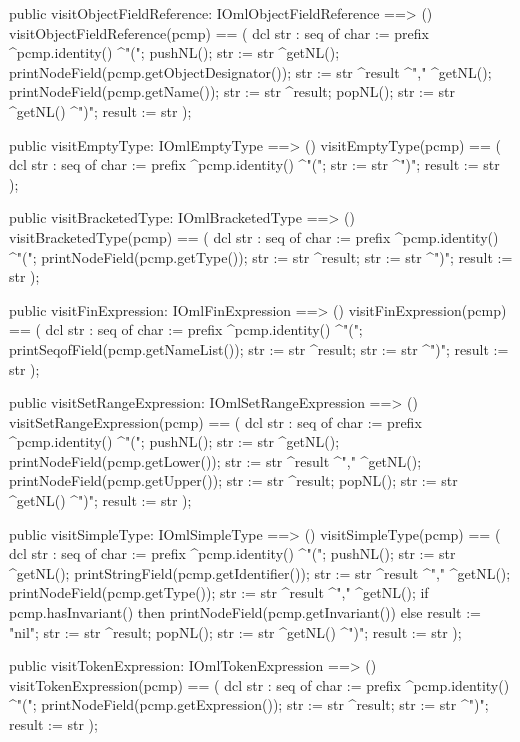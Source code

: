 \begin{vdm_al}
  public visitObjectFieldReference: IOmlObjectFieldReference ==> ()
  visitObjectFieldReference(pcmp) ==
    ( dcl str : seq of char := prefix ^pcmp.identity() ^"(";
      pushNL();
      str := str ^getNL();
      printNodeField(pcmp.getObjectDesignator());
      str := str ^result ^"," ^getNL();
      printNodeField(pcmp.getName());
      str := str ^result;
      popNL();
      str := str ^getNL() ^")";
      result := str );

  public visitEmptyType: IOmlEmptyType ==> ()
  visitEmptyType(pcmp) ==
    ( dcl str : seq of char := prefix ^pcmp.identity() ^"(";
      str := str ^")";
      result := str );

  public visitBracketedType: IOmlBracketedType ==> ()
  visitBracketedType(pcmp) ==
    ( dcl str : seq of char := prefix ^pcmp.identity() ^"(";
      printNodeField(pcmp.getType());
      str := str ^result;
      str := str ^")";
      result := str );

  public visitFinExpression: IOmlFinExpression ==> ()
  visitFinExpression(pcmp) ==
    ( dcl str : seq of char := prefix ^pcmp.identity() ^"(";
      printSeqofField(pcmp.getNameList());
      str := str ^result;
      str := str ^")";
      result := str );

  public visitSetRangeExpression: IOmlSetRangeExpression ==> ()
  visitSetRangeExpression(pcmp) ==
    ( dcl str : seq of char := prefix ^pcmp.identity() ^"(";
      pushNL();
      str := str ^getNL();
      printNodeField(pcmp.getLower());
      str := str ^result ^"," ^getNL();
      printNodeField(pcmp.getUpper());
      str := str ^result;
      popNL();
      str := str ^getNL() ^")";
      result := str );

  public visitSimpleType: IOmlSimpleType ==> ()
  visitSimpleType(pcmp) ==
    ( dcl str : seq of char := prefix ^pcmp.identity() ^"(";
      pushNL();
      str := str ^getNL();
      printStringField(pcmp.getIdentifier());
      str := str ^result ^"," ^getNL();
      printNodeField(pcmp.getType());
      str := str ^result ^"," ^getNL();
      if pcmp.hasInvariant()
      then printNodeField(pcmp.getInvariant())
      else result := "nil";
      str := str ^result;
      popNL();
      str := str ^getNL() ^")";
      result := str );

  public visitTokenExpression: IOmlTokenExpression ==> ()
  visitTokenExpression(pcmp) ==
    ( dcl str : seq of char := prefix ^pcmp.identity() ^"(";
      printNodeField(pcmp.getExpression());
      str := str ^result;
      str := str ^")";
      result := str );


\end{vdm_al}
